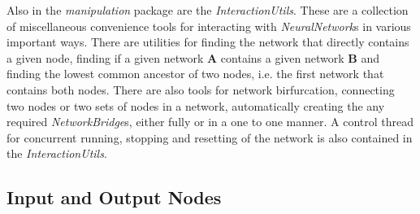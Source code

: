 \documentclass{acm_proc_article-sp}
\begin{document}
{Also in the {\textit{manipulation}} package are the {\textit{InteractionUtils}}. These are a collection of miscellaneous convenience tools for interacting with {\textit{NeuralNetwork}}s in various important ways. There are utilities for finding the network that directly contains a given node, finding if a given network {\textbf{A}} contains a given network {\textbf{B}} and finding the lowest common ancestor of two nodes, i.e. the first network that contains both nodes. There are also tools for network birfurcation, connecting two nodes or two sets of nodes in a network, automatically creating the any required {\textit{NetworkBridge}}s, either fully or in a one to one manner. A control thread for concurrent running, stopping and resetting of the network is also contained in the {\textit{InteractionUtils}}.
}
\subsection{Input and Output Nodes}
\end{document}
